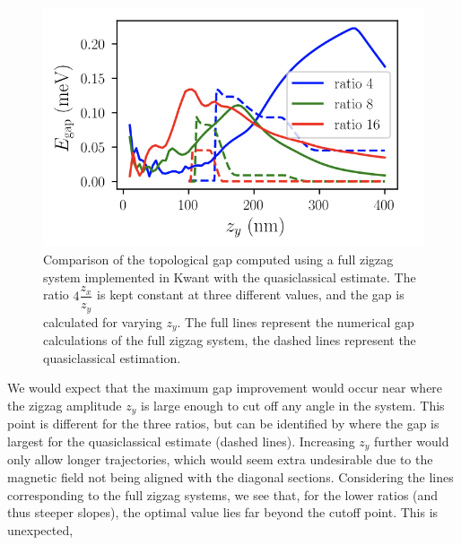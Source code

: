 			\begin{figure}[!htb]
			\centering
			\includegraphics[width=0.95\columnwidth]{figures/quasiclassical_approximation}
			\caption{Comparison of the topological gap computed using a full zigzag system implemented in Kwant with the quasiclassical estimate. The ratio $4\dfrac{z_x}{z_y}$ is kept constant at three different values, and the gap is calculated for varying $z_y$.
			The full lines represent  the numerical gap calculations of the full zigzag system, the dashed lines represent the quasiclassical estimation.}
			\label{fig:quasiclassical_approximation}
			\end{figure}

			We would expect that the maximum gap improvement would occur near where the zigzag amplitude $z_y$ is large enough to cut off any angle in the system.
			This point is different for the three ratios, but can be identified by where the gap is largest for the quasiclassical estimate (dashed lines).
			Increasing $z_y$ further would only allow longer trajectories, which would seem extra undesirable due to the magnetic field not being aligned with the diagonal sections.
			Considering the lines corresponding to the full zigzag systems, we see that, for the lower ratios (and thus steeper slopes), the optimal value lies far beyond the cutoff point.
			This is unexpected, 